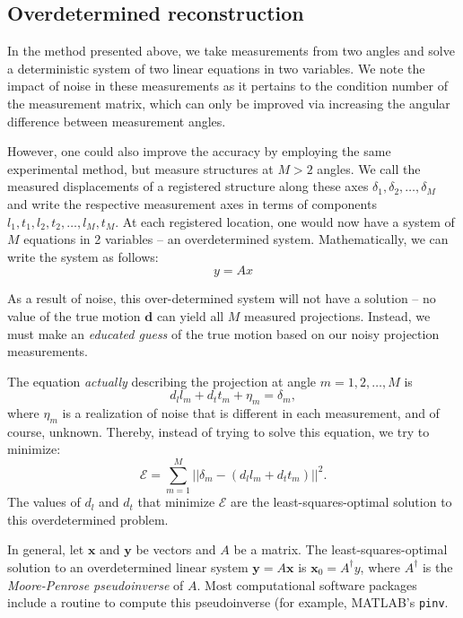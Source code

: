 \documentclass[preprint,NumberedRefs]{JASA}
\begin{document}
\subsection{Overdetermined reconstruction}
\par{In the method presented above, we take measurements from two angles and solve a deterministic system of two linear equations in two variables. We note the impact of noise in these measurements as it pertains to the condition number of the measurement matrix, which can only be improved via increasing the angular difference between measurement angles.}
\par{However, one could also improve the accuracy by employing the same experimental method, but measure structures at $M>2$ angles. We call the measured displacements of a registered structure along these axes $\delta_1,\delta_2,\ldots,\delta_M$ and write the respective measurement axes in terms of components $l_1,t_1,l_2,t_2,\ldots,l_M,t_M$. At each registered location, one would now have a system of $M$ equations in 2 variables -- an overdetermined system. Mathematically, we can write the system as follows:
	\begin{equation}
		y=Ax
		\label{overd}
	\end{equation}
}
\par{As a result of noise, this over-determined system will not have a solution -- no value of the true motion $\mathbf{d}$ can yield all $M$ measured projections. Instead, we must make an \textit{educated guess} of the true motion based on our noisy projection measurements.}
\par{The equation \textit{actually} describing the projection at angle $m=1,2,\ldots,M$ is 
	\begin{equation}
		d_l l_m+d_t t_m + \eta_m = \delta_m,
	\end{equation}
where $\eta_m$ is a realization of noise that is different in each measurement, and of course, unknown. Thereby, instead of trying to solve this equation, we try to minimize:
\begin{equation}
	\mathcal{E}=\sum_{m=1}^M ||\delta_m-(d_ll_m + d_t t_m)||^2.
\end{equation}
The values of $d_l$ and $d_t$ that minimize $\mathcal{E}$ are the least-squares-optimal solution to this overdetermined problem.}
\par{In general, let $\mathbf{x}$ and $\mathbf{y}$ be vectors and $A$ be a matrix. The least-squares-optimal solution to an overdetermined linear system $\mathbf{y}=A\mathbf{x}$ is $\mathbf{x}_0=A^\dagger y$, where $A^\dagger$ is the \textit{Moore-Penrose pseudoinverse} of $A$. Most computational software packages include a routine to compute this pseudoinverse (for example, MATLAB's \texttt{pinv}.}
\end{document}
